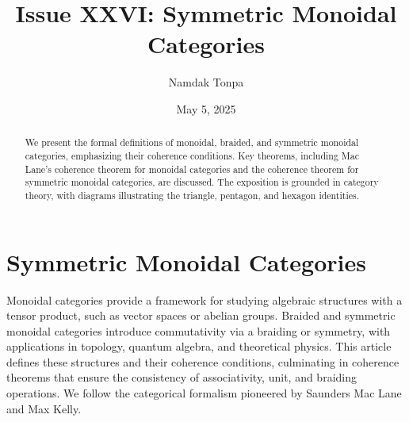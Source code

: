 \documentclass{article}
\theoremstyle{plain}
\theoremstyle{remark}
\begin{document}
\title{Issue XXVI: Symmetric Monoidal Categories}
\author{Namdak Tonpa}
\date{May 5, 2025}

\maketitle

\begin{abstract}
We present the formal definitions of monoidal, braided, and symmetric monoidal categories, emphasizing their coherence conditions. Key theorems, including Mac Lane's coherence theorem for monoidal categories and the coherence theorem for symmetric monoidal categories, are discussed. The exposition is grounded in category theory, with diagrams illustrating the triangle, pentagon, and hexagon identities.
\end{abstract}

\ifincludeTOC
  \tableofcontents
\fi

\section{Symmetric Monoidal Categories}

Monoidal categories provide a framework for studying algebraic structures with a tensor product,
such as vector spaces or abelian groups. Braided and symmetric monoidal categories introduce
commutativity via a braiding or symmetry, with applications in topology, quantum algebra,
and theoretical physics. This article defines these structures and their coherence conditions,
culminating in coherence theorems that ensure the consistency of associativity, unit,
and braiding operations. We follow the categorical formalism pioneered by
Saunders Mac Lane and Max Kelly.
\end{document}
